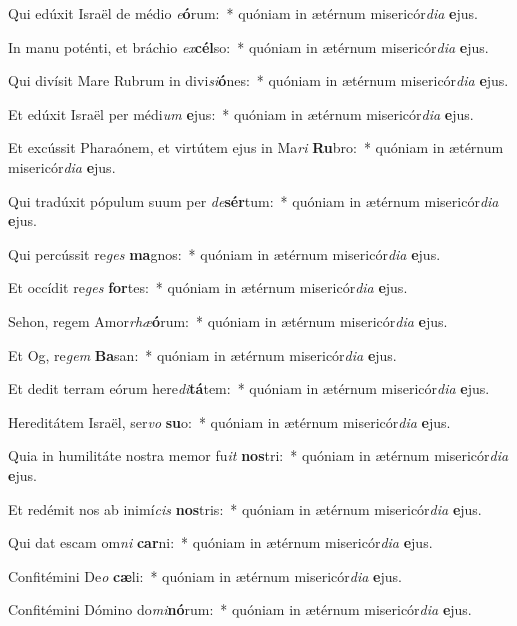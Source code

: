 \item Qui edúxit Israël de médio \textit{e}\textbf{ó}rum:~* quóniam in ætérnum misericór\textit{di}\textit{a} \textbf{e}jus.
\item In manu poténti, et bráchio \textit{ex}\textbf{cél}so:~* quóniam in ætérnum misericór\textit{di}\textit{a} \textbf{e}jus.
\item Qui divísit Mare Rubrum in divi\textit{si}\textbf{ó}nes:~* quóniam in ætérnum misericór\textit{di}\textit{a} \textbf{e}jus.
\item Et edúxit Israël per médi\textit{um} \textbf{e}jus:~* quóniam in ætérnum misericór\textit{di}\textit{a} \textbf{e}jus.
\item Et excússit Pharaónem, et virtútem ejus in Ma\textit{ri} \textbf{Ru}bro:~* quóniam in ætérnum misericór\textit{di}\textit{a} \textbf{e}jus.
\item Qui tradúxit pópulum suum per \textit{de}\textbf{sér}tum:~* quóniam in ætérnum misericór\textit{di}\textit{a} \textbf{e}jus.
\item Qui percússit re\textit{ges} \textbf{ma}gnos:~* quóniam in ætérnum misericór\textit{di}\textit{a} \textbf{e}jus.
\item Et occídit re\textit{ges} \textbf{for}tes:~* quóniam in ætérnum misericór\textit{di}\textit{a} \textbf{e}jus.
\item Sehon, regem Amor\textit{rhæ}\textbf{ó}rum:~* quóniam in ætérnum misericór\textit{di}\textit{a} \textbf{e}jus.
\item Et Og, re\textit{gem} \textbf{Ba}san:~* quóniam in ætérnum misericór\textit{di}\textit{a} \textbf{e}jus.
\item Et dedit terram eórum here\textit{di}\textbf{tá}tem:~* quóniam in ætérnum misericór\textit{di}\textit{a} \textbf{e}jus.
\item Hereditátem Israël, ser\textit{vo} \textbf{su}o:~* quóniam in ætérnum misericór\textit{di}\textit{a} \textbf{e}jus.
\item Quia in humilitáte nostra memor fu\textit{it} \textbf{nos}tri:~* quóniam in ætérnum misericór\textit{di}\textit{a} \textbf{e}jus.
\item Et redémit nos ab inimí\textit{cis} \textbf{nos}tris:~* quóniam in ætérnum misericór\textit{di}\textit{a} \textbf{e}jus.
\item Qui dat escam om\textit{ni} \textbf{car}ni:~* quóniam in ætérnum misericór\textit{di}\textit{a} \textbf{e}jus.
\item Confitémini De\textit{o} \textbf{cæ}li:~* quóniam in ætérnum misericór\textit{di}\textit{a} \textbf{e}jus.
\item Confitémini Dómino do\textit{mi}\textbf{nó}rum:~* quóniam in ætérnum misericór\textit{di}\textit{a} \textbf{e}jus.
